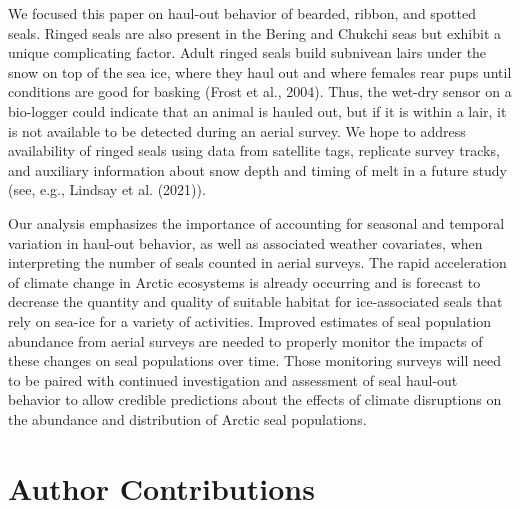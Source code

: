 \documentclass[fleqn,10pt,lineno]{wlpeerj} %
\begin{document}
We focused this paper on haul-out behavior of bearded, ribbon, and spotted
seals. Ringed seals are also present in the Bering and Chukchi seas but exhibit
a unique complicating factor. Adult ringed seals build subnivean lairs under the
snow on top of the sea ice, where they haul out and where females rear pups
until conditions are good for basking (Frost et al., 2004). Thus, the wet-dry sensor on
a bio-logger could indicate that an animal is hauled out, but if it is within a
lair, it is not available to be detected during an aerial survey. We hope to
address availability of ringed seals using data from satellite tags, replicate
survey tracks, and auxiliary information about snow depth and timing of melt in
a future study (see, e.g., Lindsay et al. (2021)).

Our analysis emphasizes the importance of accounting for seasonal and temporal
variation in haul-out behavior, as well as associated weather covariates,
when interpreting the number of seals counted in aerial surveys. The rapid
acceleration of climate change in Arctic ecosystems is already occurring and is
forecast to decrease the quantity and quality of suitable habitat for
ice-associated seals that rely on sea-ice for a variety of activities. Improved
estimates of seal population abundance from aerial surveys are needed to
properly monitor the impacts of these changes on seal populations over time.
Those monitoring surveys will need to be paired with continued investigation and
assessment of seal haul-out behavior to allow credible predictions about the
effects of climate disruptions on the abundance and distribution of Arctic seal
populations.

\section*{Author Contributions}\label{author-contributions}
\end{document}
